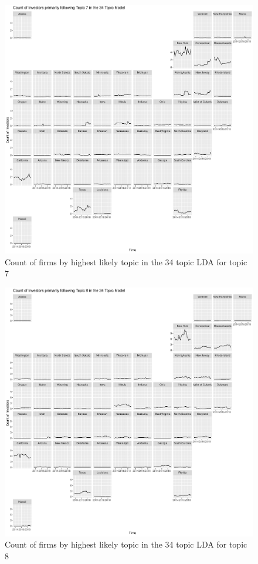		\begin{figure}
		\centering
		\includegraphics[width=1\linewidth]{Figures/ChapterV/USA_34_Topic07.pdf}
		\caption[Count of Firms for Topic 7 by Quarter]{Count of firms by highest likely topic in the 34 topic LDA for topic 7}
		\label{fig:StateLDA7}
	\end{figure}
	
		\begin{figure}
		\centering
		\includegraphics[width=1\linewidth]{Figures/ChapterV/USA_34_Topic08.pdf}
		\caption[Count of Firms for Topic 8 by Quarter]{Count of firms by highest likely topic in the 34 topic LDA for topic 8}
		\label{fig:StateLDA8}
	\end{figure}
	
